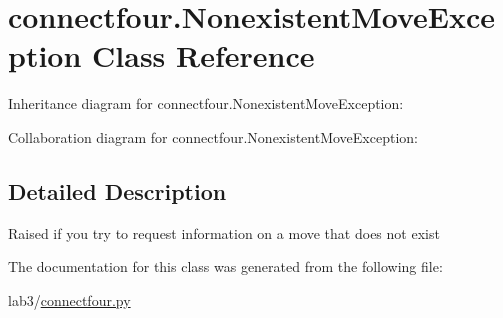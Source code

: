 \hypertarget{classconnectfour_1_1_nonexistent_move_exception}{}\section{connectfour.\+Nonexistent\+Move\+Exception Class Reference}
\label{classconnectfour_1_1_nonexistent_move_exception}


Inheritance diagram for connectfour.\+Nonexistent\+Move\+Exception\+:


Collaboration diagram for connectfour.\+Nonexistent\+Move\+Exception\+:


\subsection{Detailed Description}
\begin{DoxyVerb}Raised if you try to request information on a move that does not exist \end{DoxyVerb}
 

The documentation for this class was generated from the following file\+:\begin{DoxyCompactItemize}
\item 
lab3/\hyperlink{connectfour_8py}{connectfour.\+py}\end{DoxyCompactItemize}
